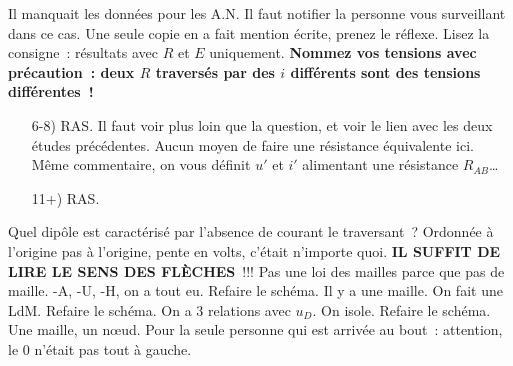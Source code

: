 \documentclass[a4paper, 10pt, final, garamond]{book}
\begin{document}
\setcounter{section}{0}
Il manquait les données pour les A.N. Il faut notifier la personne vous
surveillant dans ce cas. Une seule copie en a fait mention écrite, prenez le
réflexe.
\smallbreak
Lisez la consigne~: résultats avec $R$ et $E$ uniquement. \textbf{Nommez vos
	tensions avec précaution~: deux $R$ traversés par des $i$ différents sont des
	tensions différentes~!}

\begin{enumerate}
	 Tout et n'importe quoi. Points pour $R_1+R_2$ en série, $G_1+G_2$ en
	parallèle. Des schémas fantastiques, dans le sens «~créé par l'imagination~».
	 \textbf{Reprenez les exercices sur les résistances équivalentes}.
	Bien essayé pour les court-circuits, mais non.
	 Je vous avais dit de nommer vos points, et qu'un interrupteur ouvert
	a en général une tension non nulle. Aucune débrouillardise pour traiter ce
	circuit en régime permanent.
	\begin{tcb}*(prop)"bomb"{}
		\begin{tasks}(2)
			\task $u = Ri$ ne vaut \textbf{que pour une résistance~!!}
			\task Interrupteur ouvert $\boxed{\Ra u \neq 0}$ par essence~!!
		\end{tasks}
	\end{tcb}
	 2 bonnes réponses sur 44 copies. \textbf{Ne mettez pas vos tensions
		n'importe où~!!} Une tension est une \textbf{différence de potentiel}, donc
	vous ne pouvez pas simplifier le circuit et dire «~cette tension c'est $v$~».
	 Idem avec les courants. Si vous créez un nouveau nœud, le courant
	représenté n'est plus le même.
	\item[6-8)]{} RAS.
	\setcounter{enumi}{8}
	 Il faut voir plus loin que la question, et voir le lien avec les
	deux études précédentes.
	 Aucun moyen de faire une résistance équivalente ici. Même
	commentaire, on vous définit $u'$ et $i'$ alimentant une résistance $R_{AB}$…
	\item[11+)]{} RAS.
\end{enumerate}

\begin{enumerate}
	 Quel dipôle est caractérisé par l'absence de courant le traversant~?
	 Ordonnée à l'origine pas à l'origine, pente en volts, c'était
	n'importe quoi.
	 \textbf{IL SUFFIT DE LIRE LE SENS DES FLÈCHES}~!!! Pas une loi des
	mailles parce que pas de maille.
	 -A, -U, -H, on a tout eu.
	 Refaire le schéma. Il y a une maille. On fait une LdM.
	 Refaire le schéma. On a 3 relations avec $u_D$. On isole.
	 Refaire le schéma. Une maille, un nœud.
	 Pour la seule personne qui est arrivée au bout~: attention, le 0
	n'était pas tout à gauche.
\end{enumerate}
\end{document}
